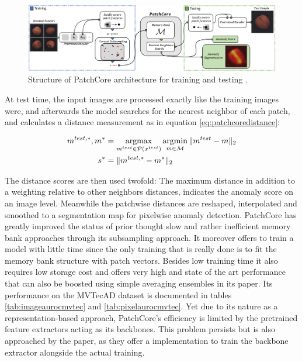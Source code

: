 \begin{figure}[ht]
    \centering
    \includegraphics[width=\textwidth]{figures/pathcore_architecture.png}
    \caption{Structure of PatchCore architecture for training and testing \cite{patchCore2022}.}
    \label{fig:patchcorearchitecture}
\end{figure}

At test time, the input images are processed exactly like the training images were, and afterwards the model searches for the nearest neighbor of each patch, and calculates a distance measurement as 
in equation \ref{eq:patchcoredistance}:

\begin{equation}
\label{eq:patchcoredistance}
\begin{split}
m^{test, *}, m^{*} &= \operatorname*{argmax}_{m^{test} \in \mathcal{P}(x^{test})} \operatorname*{argmin}_{m \in \mathcal{M}} \| m^{test} - m \|_{2} \\
s^{*} &= \| m^{test, *} - m^{*} \|_{2}
\end{split}
\end{equation}

The distance scores are then used twofold: The maximum distance in addition to a weighting relative to other neighbors distances, indicates the anomaly score on an image level. Meanwhile the patchwise distances are reshaped, 
interpolated and smoothed to a segmentation map for pixelwise anomaly detection.
\newline
PatchCore has greatly improved the status of prior thought slow and rather inefficient memory bank approaches through its subsampling approach. It moreover offers to train a model with little time 
since the only training that is really done is to fit the memory bank structure with patch vectors. Besides low training time it also requires low storage cost and offers very high and state of the art 
performance that can also be boosted using simple averaging ensembles in its paper. Its performance on the MVTecAD dataset \cite{MVTEC_Bergmann_2021} is documented in tables \ref{tab:imageaurocmvtec} and \ref{tab:pixelaurocmvtec}. Yet due to its nature as a representation-based approach, PatchCore's 
efficiency is limited by the pretrained feature extractors acting as its backbones. This problem persists but is also approached by the paper, as they offer a implementation to train the backbone 
extractor alongside the actual training.


